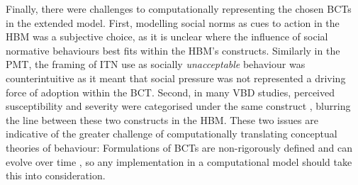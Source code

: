 Finally, there were challenges to computationally representing the chosen BCTs in the extended model. First, modelling social norms as cues to action in the HBM was a subjective choice, as it is unclear where the influence of social normative behaviours best fits within the HBM's constructs. Similarly in the PMT, the framing of ITN use as socially \textit{unacceptable} behaviour was counterintuitive as it meant that social pressure was not represented a driving force of adoption within the BCT. Second, in many VBD studies, perceived susceptibility and severity were categorised under the same construct \cite{kakaire_role_2023, watanabe_determinants_2014, yirsaw_insecticide-treated_2021, fonzo_we_2024, raude_public_2012}, blurring the line between these two constructs in the HBM. These two issues are indicative of the greater challenge of computationally translating conceptual theories of behaviour: Formulations of BCTs are non-rigorously defined and can evolve over time \cite{norman_protection_2015, champion_health_2015}, so any implementation in a computational model should take this into consideration.
